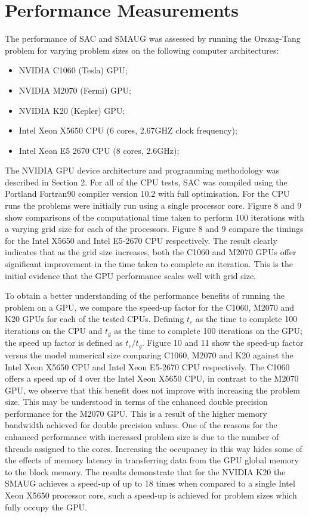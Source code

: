 \documentclass[final,1p]{elsarticle}
\begin{document}
\section{Performance Measurements}
The performance of SAC and SMAUG was assessed by running the Orszag-Tang problem for varying problem sizes on the following computer architectures:
\begin{itemize}
\item NVIDIA C1060 (Tesla) GPU;
\item NVIDIA M2070 (Fermi) GPU;
\item NVIDIA K20   (Kepler) GPU;
\item Intel Xeon X5650 CPU (6 cores, 2.67GHZ clock frequency);
\item Intel Xeon E5 2670 CPU (8 cores, 2.6GHz); 
\end{itemize}

The NVIDIA GPU device architecture and programming methodology was described in Section 2. For all of the CPU tests, SAC was compiled using the Portland Fortran90 compiler version 10.2 with full optimisation. For the CPU runs the problems were initially run using a single processor core. Figure 8 and 9 show comparisons of the computational time taken to perform 100 iterations with a varying grid size for each of the processors. Figure 8 and 9 compare the timings for the Intel X5650  and Intel E5-2670 CPU respectively. The result clearly indicates that as the grid size increases, both the C1060 and M2070 GPUs offer significant improvement in the time taken to complete an iteration. This is the initial evidence that the GPU performance scales well with grid size. 

To obtain a better understanding of the performance benefits of running the problem on a GPU, we compare the speed-up factor for the C1060, M2070 and K20 GPUs for each of the tested CPUs. Defining $t_{c}$ as the time to complete 100 iterations on the CPU and $t_{g}$ as the time to complete 100 iterations on the GPU; the speed up factor is defined as ${t_{c}}/{t_{g}}$. Figure 10 and 11 show the speed-up factor versus the model numerical size comparing C1060, M2070 and K20 against the Intel Xeon X5650 CPU and Intel Xeon E5-2670 CPU respectively.  The C1060 offers a speed up of 4 over the Intel Xeon X5650 CPU, in contrast to the M2070 GPU, we observe that this benefit does not improve with increasing the problem size. This may be understood in terms of the enhanced double precision performance for the M2070 GPU. This is a result of the higher memory bandwidth achieved for double precision values. One of the reasons for the enhanced performance with increased problem size is due to the number of threads assigned to the cores. Increasing the occupancy in this way hides some of the effects of memory latency in transferring data from the GPU global memory to the block memory. The results demonstrate that for the NVIDIA K20 the SMAUG achieves a speed-up of up to 18 times when compared to a single Intel Xeon X5650 processor core, such a speed-up is achieved for problem sizes which fully occupy the GPU. 
\end{document}
